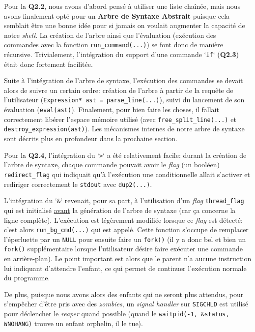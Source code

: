 \documentclass{article}
\begin{document}
Pour la \textbf{Q2.2}, nous avons d'abord pensé à utiliser une liste chaînée, mais nous avons finalement opté pour un \textbf{Arbre de Syntaxe Abstrait} puisque cela semblait être une bonne idée pour si jamais on voulait augmenter la capacité de notre \textit{shell}. La création de l'arbre ainsi que l'évaluation (exécution des commandes avec la fonction \texttt{run\_command(...)}) se font donc de manière récursive. Trivialement, l'intégration du support d'une commande `\texttt{if}` (\textbf{Q2.3}) était donc fortement facilitée.

Suite à l'intégration de l'arbre de syntaxe, l'exécution des commandes se devait alors de suivre un certain ordre: création de l'arbre à partir de la requête de l'utilisateur (\texttt{Expression* ast = parse\_line(...)}), suivi du lancement de son évaluation (\texttt{eval(ast)}). Finalement, pour bien faire les choses, il fallait correctement libérer l'espace mémoire utilisé (avec \texttt{free\_split\_line(...)} et \texttt{destroy\_expression(ast)}). Les mécanismes internes de notre arbre de syntaxe sont décrits plus en profondeur dans la prochaine section.\newline

Pour la \textbf{Q2.4}, l'intégration du `\texttt{>}` a été relativement facile: durant la création de l'arbre de syntaxe, chaque commande pouvait avoir le \textit{flag} (un booléen) \texttt{redirect\_flag} qui indiquait qu'à l'exécution une conditionnelle allait s'activer et rediriger correctement le \texttt{stdout} avec \texttt{dup2(...)}.

L'intégration du `\texttt{\&}` revenait, pour sa part, à l'utilisation d'un \textit{flag} \texttt{thread\_flag} qui est initialisé \underline{avant} la génération de l'arbre de syntaxe (car ça concerne la ligne complète). L'exécution est légèrement modifiée lorsque ce \textit{flag} est détecté: c'est alors \texttt{run\_bg\_cmd(...)} qui est appelé. Cette fonction s'occupe de remplacer l'éperluette par un \texttt{NULL} pour ensuite faire un \texttt{fork()} (il y a donc bel et bien un \texttt{fork()} supplémentaire lorsque l'utilisateur désire faire exécuter une commande en arrière-plan). Le point important est alors que le parent n'a aucune instruction lui indiquant d'attendre l'enfant, ce qui permet de continuer l'exécution normale du programme.

De plus, puisque nous avons alors des enfants qui ne seront plus attendus, pour s'empêcher d'être pris avec des \textit{zombies}, un \textit{signal handler} sur \texttt{SIGCHLD} est utilisé pour déclencher le \textit{reaper} quand possible (quand le \texttt{waitpid(-1, \&status, WNOHANG)} trouve un enfant orphelin, il le tue).\newline
\end{document}
